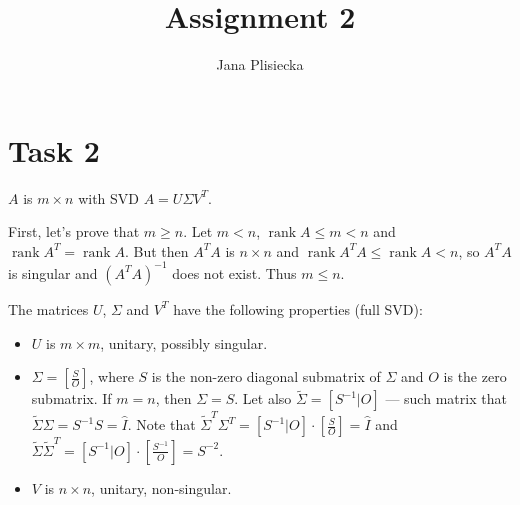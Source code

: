 \documentclass[14pt, notitlepage]{article}
\author{Jana Plisiecka}
\DeclareMathOperator{\rank}{rank}
\begin{document}
\title{Assignment 2}
\maketitle

\section*{Task 2}

$A$ is $m \times n$ with SVD $A = U \Sigma V^T $. 

First, let's prove that $ m \geqslant n $. Let $ m < n $, $\rank A \leqslant m < n$ and $ \rank A^T = \rank A $.
But then $A^T A$ is $n \times n$ and $ \rank A^T A \leqslant \rank A < n $, so $A^T A $ is singular and 
$\left( A^T A \right)^{-1} $ does not exist. Thus $ m \leqslant n $.

The matrices $U$, $\Sigma$ and $V^T$ have the following properties (full SVD):
\begin{itemize}
    \item $U$ is $ m \times m$, unitary, possibly singular.
    \item $\Sigma = \left[\frac{S}{O} \right] $, where $S$ is the non-zero diagonal submatrix of $\Sigma$
        and $O$ is the zero submatrix. If $m = n$, then $\Sigma = S$.
        Let also $\tilde{\Sigma} = \left[S^{-1} | O\right]$ --- such matrix that $\tilde{\Sigma} \Sigma = S^{-1}S = \hat{I}$.
        Note that $ \tilde{\Sigma}^T \Sigma^T = \left[ S^{-1} | O \right] \cdot \left[ \frac{S}{O} \right] = \hat{I} $ and
        $\tilde{\Sigma} \tilde{\Sigma}^T = \left[S^{-1} | O\right] \cdot \left[ \frac{S^{-1}}{O} \right] = S^{-2}$.
    \item $V$ is $n \times n$, unitary, non-singular.
\end{itemize}
\end{document}
